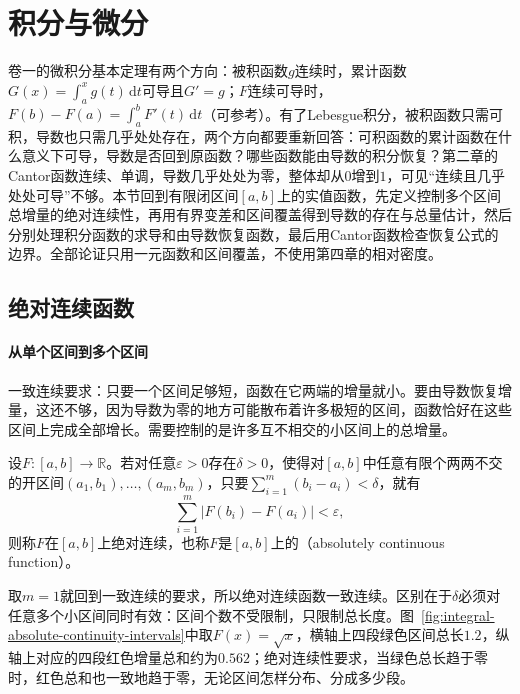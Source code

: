 \section{积分与微分}
\label{sec:integral-differentiation}

卷一的微积分基本定理有两个方向：被积函数$g$连续时，累计函数$G(x)=\int_a^xg(t)\,\mathrm dt$可导且$G'=g$；$F$连续可导时，$F(b)-F(a)=\int_a^bF'(t)\,\mathrm dt$（可参考）。有了Lebesgue积分，被积函数只需可积，导数也只需几乎处处存在，两个方向都要重新回答：可积函数的累计函数在什么意义下可导，导数是否回到原函数？哪些函数能由导数的积分恢复？第二章的Cantor函数连续、单调，导数几乎处处为零，整体却从$0$增到$1$，可见“连续且几乎处处可导”不够。本节回到有限闭区间$[a,b]$上的实值函数，先定义控制多个区间总增量的绝对连续性，再用有界变差和区间覆盖得到导数的存在与总量估计，然后分别处理积分函数的求导和由导数恢复函数，最后用Cantor函数检查恢复公式的边界。全部论证只用一元函数和区间覆盖，不使用第四章的相对密度。

\subsection{绝对连续函数}
\label{sec:integral-absolutely-continuous}

\paragraph{从单个区间到多个区间}
一致连续要求：只要一个区间足够短，函数在它两端的增量就小。要由导数恢复增量，这还不够，因为导数为零的地方可能散布着许多极短的区间，函数恰好在这些区间上完成全部增长。需要控制的是许多互不相交的小区间上的总增量。

\begin{definition}[绝对连续函数]
\label{def:integral-absolutely-continuous-function}
设$F:[a,b]\to\mathbb R$。若对任意$\varepsilon>0$存在$\delta>0$，使得对$[a,b]$中任意有限个两两不交的开区间$(a_1,b_1),\ldots,(a_m,b_m)$，只要$\sum_{i=1}^m(b_i-a_i)<\delta$，就有
\[
 \sum_{i=1}^m|F(b_i)-F(a_i)|<\varepsilon,
\]
则称$F$在$[a,b]$上绝对连续，也称$F$是$[a,b]$上的（absolutely continuous function）。
\end{definition}

取$m=1$就回到一致连续的要求，所以绝对连续函数一致连续。区别在于$\delta$必须对任意多个小区间同时有效：区间个数不受限制，只限制总长度。图~\ref{fig:integral-absolute-continuity-intervals}中取$F(x)=\sqrt x$，横轴上四段绿色区间总长$1.2$，纵轴上对应的四段红色增量总和约为$0.562$；绝对连续性要求，当绿色总长趋于零时，红色总和也一致地趋于零，无论区间怎样分布、分成多少段。

